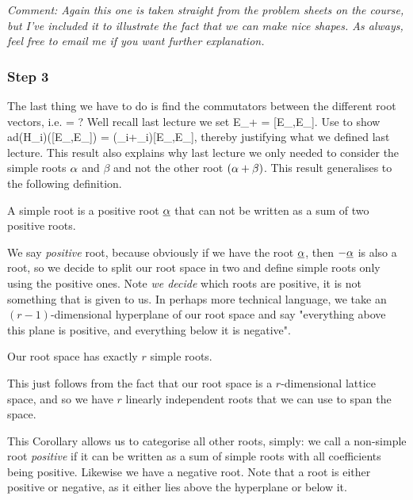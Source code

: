     \textit{Comment: Again this one is taken straight from the problem sheets on the course, but I've included it to illustrate the fact that we can make nice shapes. As always, feel free to email me if you want further explanation.} 
\ebox 

\subsubsection{Step 3}

The last thing we have to do is find the commutators between the different root vectors, i.e. 
 = ?
\ese 
Well recall last lecture we set 
\bse 
    E_{\a+\beta} = [E_{\a},E_{\beta}]. 
\ese 
\bbox 
    Use  to show 
    \bse 
        ad(H_i)\big([E_{\underline{\a}},E_{\underline{\beta}}]\big) = (\a_i+\beta_i)[E_{\underline{\a}},E_{\underline{\beta}}],
    \ese 
    thereby justifying what we defined last lecture.
\ebox 
This result also explains why last lecture we only needed to consider the simple roots $\alpha$ and $\beta$ and not the other root $(\alpha+\beta)$. This result generalises to the following definition. 

    A simple root is a positive root $\underline{\alpha}$ that can not be written as a sum of two positive roots. 
\ed 

\br 
    We say \textit{positive} root, because obviously if we have the root $\underline{\alpha}$, then $-\underline{\alpha}$ is also a root, so we decide to split our root space in two and define simple roots only using the positive ones. Note \textit{we decide} which roots are positive, it is not something that is given to us. In perhaps more technical language, we take an $(r-1)$-dimensional hyperplane of our root space and say "everything above this plane is positive, and everything below it is negative".
\er 

\bc 
    Our root space has exactly $r$ simple roots.
\ec 

\bq 
    This just follows from the fact that our root space is a $r$-dimensional lattice space, and so we have $r$ linearly independent roots that we can use to span the space. 
\eq 

This Corollary allows us to categorise all other roots, simply: we call a non-simple root \textit{positive} if it can be written as a sum of simple roots with all coefficients being positive. Likewise we have a negative root. Note that a root is either positive or negative, as it either lies above the hyperplane or below it. 

